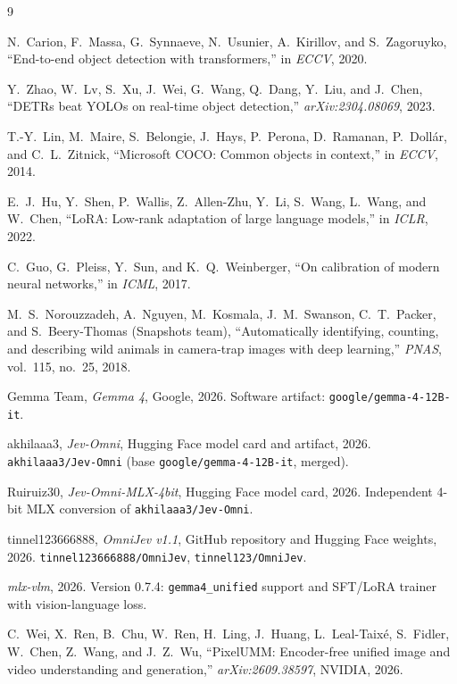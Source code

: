 \documentclass[11pt]{article}
\newcommand{\code}[1]{\texttt{#1}}
\begin{document}
\begin{thebibliography}{9}

N.~Carion, F.~Massa, G.~Synnaeve, N.~Usunier, A.~Kirillov, and S.~Zagoruyko,
``End-to-end object detection with transformers,'' in \emph{ECCV}, 2020.

Y.~Zhao, W.~Lv, S.~Xu, J.~Wei, G.~Wang, Q.~Dang, Y.~Liu, and J.~Chen,
``DETRs beat YOLOs on real-time object detection,'' \emph{arXiv:2304.08069},
2023.

T.-Y.~Lin, M.~Maire, S.~Belongie, J.~Hays, P.~Perona, D.~Ramanan,
P.~Doll\'ar, and C.~L.~Zitnick,
``Microsoft COCO: Common objects in context,'' in \emph{ECCV}, 2014.

E.~J.~Hu, Y.~Shen, P.~Wallis, Z.~Allen-Zhu, Y.~Li, S.~Wang, L.~Wang, and
W.~Chen,
``LoRA: Low-rank adaptation of large language models,'' in \emph{ICLR}, 2022.

C.~Guo, G.~Pleiss, Y.~Sun, and K.~Q.~Weinberger,
``On calibration of modern neural networks,'' in \emph{ICML}, 2017.

M.~S.~Norouzzadeh, A.~Nguyen, M.~Kosmala, J.~M.~Swanson, C.~T.~Packer, and
S.~Beery-Thomas (Snapshots team),
``Automatically identifying, counting, and describing wild animals in
camera-trap images with deep learning,'' \emph{PNAS}, vol.~115, no.~25, 2018.

Gemma Team, \emph{Gemma 4}, Google, 2026. Software artifact:
\code{google/gemma-4-12B-it}.

akhilaaa3, \emph{Jev-Omni}, Hugging Face model card and artifact, 2026.
\code{akhilaaa3/Jev-Omni} (base \code{google/gemma-4-12B-it}, merged).

Ruiruiz30, \emph{Jev-Omni-MLX-4bit}, Hugging Face model card, 2026.
Independent 4-bit MLX conversion of \code{akhilaaa3/Jev-Omni}.

tinnel123666888, \emph{OmniJev v1.1}, GitHub repository and Hugging Face
weights, 2026. \code{tinnel123666888/OmniJev}, \code{tinnel123/OmniJev}.

\emph{mlx-vlm}, 2026. Version 0.7.4: \code{gemma4\_unified} support and
SFT/LoRA trainer with vision-language loss.

C.~Wei, X.~Ren, B.~Chu, W.~Ren, H.~Ling, J.~Huang, L.~Leal-Taix\'e,
S.~Fidler, W.~Chen, Z.~Wang, and J.~Z.~Wu,
``PixelUMM: Encoder-free unified image and video understanding and
generation,'' \emph{arXiv:2609.38597}, NVIDIA, 2026.


\end{thebibliography}
\end{document}
